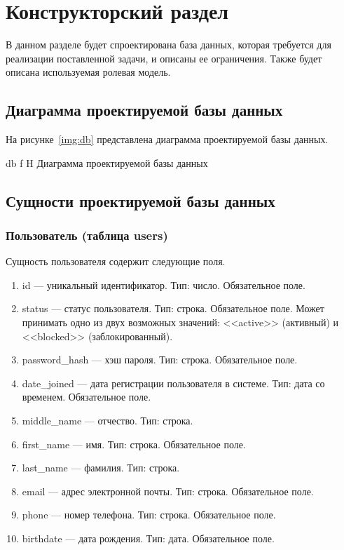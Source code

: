\chapter{Конструкторский раздел}

В данном разделе будет спроектирована база данных, которая требуется для реализации поставленной задачи, и описаны ее ограничения. Также будет описана используемая ролевая модель.

\section{Диаграмма проектируемой базы данных}

На рисунке~\ref{img:db} представлена диаграмма проектируемой базы данных.

    {db}
    {f}
    {H}
    {\textwidth}
    {Диаграмма проектируемой базы данных}

\section{Сущности проектируемой базы данных}

\subsection{Пользователь (таблица users)}

Сущность пользователя содержит следующие поля.

\begin{enumerate}
    \item id --- уникальный идентификатор. Тип: число. Обязательное поле.
    \item status --- статус пользователя. Тип: строка. Обязательное поле. Может принимать одно из двух возможных значений: <<active>> (активный) и <<blocked>> (заблокированный).
    \item password\_hash --- хэш пароля. Тип: строка. Обязательное поле.
    \item date\_joined --- дата регистрации пользователя в системе. Тип: дата со временем. Обязательное поле.
    \item middle\_name --- отчество. Тип: строка.
    \item first\_name --- имя. Тип: строка. Обязательное поле.
    \item last\_name --- фамилия. Тип: строка.
    \item email --- адрес электронной почты. Тип: строка. Обязательное поле.
    \item phone --- номер телефона. Тип: строка. Обязательное поле.
    \item birthdate --- дата рождения. Тип: дата. Обязательное поле.
\end{enumerate}

